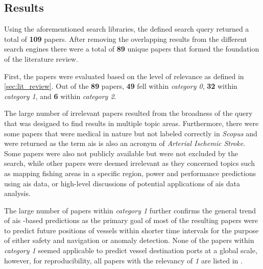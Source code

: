 \subsection{Results}

Using the aforementioned search libraries, the defined search query returned a total of \textbf{109} papers. After removing the overlapping results from the different search engines there were a total of \textbf{89} unique papers that formed the foundation of the literature review.

First, the papers were evaluated based on the level of relevance as defined in \cref{sec:lit_review}. Out of the \textbf{89} papers, \textbf{49} fell within \textit{category 0}, \textbf{32} within \textit{category 1}, and \textbf{6} within \textit{category 2}.

The large number of irrelevant papers resulted from the broadness of the query that was designed to find results in multiple topic areas. Furthermore, there were some papers that were medical in nature but not labeled correctly in \textit{Scopus} and were returned as the term \acrshort{ais} is also an acronym of \textit{Arterial Ischemic Stroke}. Some papers were also not publicly available but were not excluded by the search, while other papers were deemed irrelevant as they concerned topics such as mapping fishing areas in a specific region, power and performance predictions using \acrshort{ais} data, or high-level discussions of potential applications of \acrshort{ais} data analysis.

The large number of papers within \textit{category 1} further confirms the general trend of \acrshort{ais} -based predictions as the primary goal of most of the resulting papers were to predict future positions of vessels within shorter time intervals for the purpose of either safety and navigation or anomaly detection. None of the papers within \textit{category 1} seemed applicable to predict vessel destination ports at a global scale, however, for reproducibility, all papers with the relevancy of \textit{1} are listed in .

